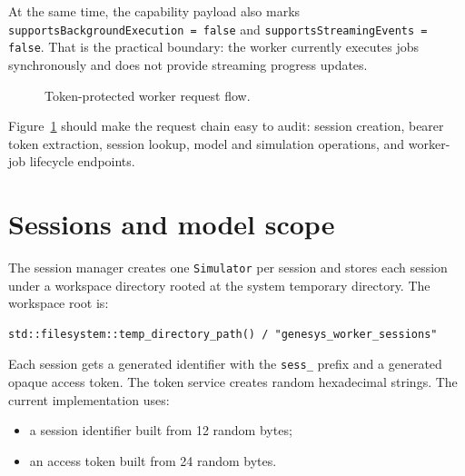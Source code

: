 At the same time, the capability payload also marks
\texttt{supportsBackgroundExecution = false} and
\texttt{supportsStreamingEvents = false}. That is the practical boundary: the
worker currently executes jobs synchronously and does not provide streaming
progress updates.

\begin{figure}[htbp]
\centering
\caption{Token-protected worker request flow.}
\label{fig:worker-token-request-flow}
\end{figure}

Figure~\ref{fig:worker-token-request-flow} should make the request chain easy
to audit: session creation, bearer token extraction, session lookup, model and
simulation operations, and worker-job lifecycle endpoints.

\section{Sessions and model scope}
\label{sec:worker-sessions}

The session manager creates one \texttt{Simulator} per session and stores each
session under a workspace directory rooted at the system temporary directory.
The workspace root is:
\begin{verbatim}
std::filesystem::temp_directory_path() / "genesys_worker_sessions"
\end{verbatim}

Each session gets a generated identifier with the \texttt{sess\_} prefix and a
generated opaque access token. The token service creates random hexadecimal
strings. The current implementation uses:
\begin{itemize}
\item a session identifier built from 12 random bytes;
\item an access token built from 24 random bytes.
\end{itemize}

